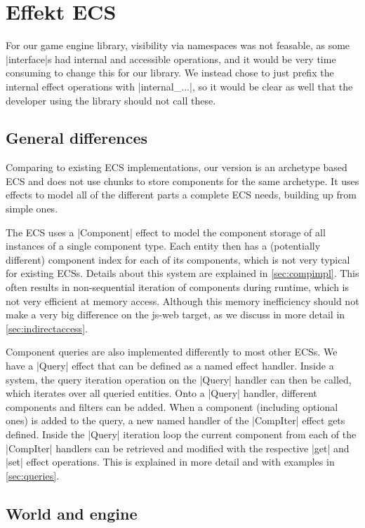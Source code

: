 \chapter{Effekt ECS}\label{chap:engine}

For our game engine library, visibility via namespaces was not feasable, as some |interface|s had internal and accessible operations, and it would be very time consuming to change this for our library. We instead chose to just prefix the internal effect operations with |internal_...|, so it would be clear as well that the developer using the library should not call these.

\section{General differences}

Comparing to existing ECS implementations, our version is an archetype based ECS and does not use chunks to store components for the same archetype. It uses effects to model all of the different parts a complete ECS needs, building up from simple ones.

The ECS uses a |Component| effect to model the component storage of all instances of a single component type. Each entity then has a (potentially different) component index for each of its components, which is not very typical for existing ECSs. Details about this system are explained in \cref{sec:compimpl}. This often results in non-sequential iteration of components during runtime, which is not very efficient at memory access. Although this memory inefficiency should not make a very big difference on the \textsf{js-web} target, as we discuss in more detail in \cref{sec:indirectaccess}.

Component queries are also implemented differently to most other ECSs. We have a |Query| effect that can be defined as a named effect handler. Inside a system, the query iteration operation on the |Query| handler can then be called, which iterates over all queried entities. Onto a |Query| handler, different components and filters can be added. When a component (including optional ones) is added to the query, a new named handler of the |CompIter| effect gets defined. Inside the |Query| iteration loop the current component from each of the |CompIter| handlers can be retrieved and modified with the respective |get| and |set| effect operations. This is explained in more detail and with examples in \cref{sec:queries}.

\section{World and engine}

